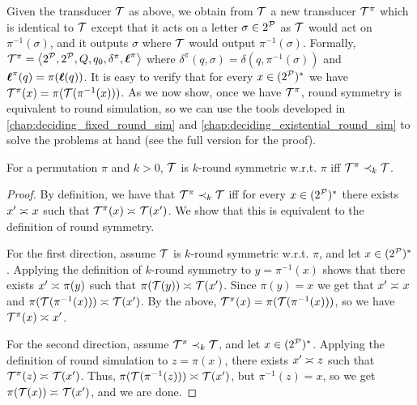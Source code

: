 Given the transducer $\mathcal{T}$ as above, we obtain from $\mathcal{T}$ a new transducer $\mathcal{T}^\pi$ which is identical to $\mathcal{T}$ except that it acts on a letter $\sigma\in 2^{\mathcal{P}}$ as $\mathcal{T}$ would act on $\pi^{-1}(\sigma)$, and it outputs $\sigma$ where $\mathcal{T}$ would output $\pi^{-1}(\sigma)$. Formally, $\mathcal{T}^{\pi}=\left< 2^{\mathcal{P}},2^{\mathcal{P}},Q,q_0,\delta^{\pi},\boldsymbol{\ell}^{\pi}\right>$ where $\delta^{\pi}(q,\sigma)=\delta(q,\pi^{-1}(\sigma))$ and $\boldsymbol{\ell}^{\pi}(q)=\pi(\boldsymbol{\ell}(q))$. It is easy to verify that for every $x\in (2^{\mathcal{P}})^*$ we have $\mathcal{T}^\pi(x) = \pi(\mathcal{T}(\pi^{-1}(x)))$.
As we now show, once we have $\mathcal{T}^\pi$, round symmetry is equivalent to round simulation, so we can use the tools developed in \autoref{chap:deciding_fixed_round_sim} and \autoref{chap:deciding_existential_round_sim} to solve the problems at hand (see the full version for the proof).
\begin{lemma}
    \label{lem:symmetry_to_simulation}
    For a permutation $\pi$ and $k>0$, $\mathcal{T}$ is $k$-round symmetric w.r.t.\! $\pi$ iff $\mathcal{T}^{\pi}\prec_k \mathcal{T}$.
\end{lemma}
\begin{proof}
    By definition, we have that $\mathcal{T}^{\pi}\prec_{k} \mathcal{T}$ iff for every $x\in (2^{\mathcal{P}})^*$ there exists $x'\asymp_{} x$ such that $\mathcal{T}^{\pi}(x)\asymp_{} \mathcal{T}(x')$. We show that this is equivalent to the definition of round symmetry.
    
    For the first direction, assume $\mathcal{T}$ is $k$-round symmetric w.r.t.\! $\pi$, and let $x\in (2^{\mathcal{P}})^*$. Applying the definition of $k$-round symmetry to $y=\pi^{-1}(x)$ shows that there exists $x'\asymp_{} \pi(y)$ such that $\pi(\mathcal{T}(y))\asymp_{} \mathcal{T}(x')$. Since $\pi(y)=x$ we get that $x'\asymp_{} x$ and $\pi(\mathcal{T}(\pi^{-1}(x)))\asymp_{} \mathcal{T}(x')$. By the above, $\mathcal{T}^\pi(x) = \pi(\mathcal{T}(\pi^{-1}(x)))$, so we have $\mathcal{T}^{\pi}(x)\asymp_{} x'$.
    
    For the second direction, assume $\mathcal{T}^\pi \prec_k \mathcal{T}$, and let $x\in (2^{\mathcal{P}})^*$. Applying the definition of round simulation to $z=\pi(x)$, there exists $x'\asymp_{} z$ such that $\mathcal{T}^{\pi}(z)\asymp_{} \mathcal{T}(x')$. Thus, $\pi(\mathcal{T}(\pi^{-1}(z)))\asymp_{} \mathcal{T}(x')$, but $\pi^{-1}(z)=x$, so we get $\pi(\mathcal{T}(x))\asymp_{} \mathcal{T}(x')$, and we are done.
\end{proof}

